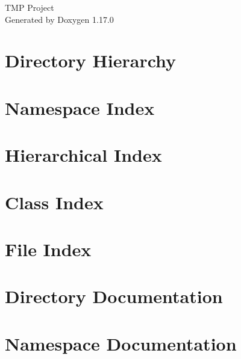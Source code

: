 \documentclass[twoside]{book}
\newcommand{\+}{\discretionary{\mbox{\scriptsize$\hookleftarrow$}}{}{}}
\newcommand{\clearemptydoublepage}{%
    \newpage{\pagestyle{empty}\cleardoublepage}%
  }
\begin{document}
  \raggedbottom
    \hypersetup{pageanchor=false,
                bookmarksnumbered=true,
                pdfencoding=unicode
               }
  \begin{titlepage}
  \vspace*{7cm}
  \begin{center}%
  {\Large TMP Project}\\
  \vspace*{1cm}
  {\large Generated by Doxygen 1.17.0}\\
  \end{center}
  \end{titlepage}
  \clearemptydoublepage
  \tableofcontents
  \clearemptydoublepage
  \hypersetup{pageanchor=true}
\chapter{Directory Hierarchy}

\chapter{Namespace Index}

\chapter{Hierarchical Index}

\chapter{Class Index}

\chapter{File Index}

\chapter{Directory Documentation}



\chapter{Namespace Documentation}


\end{document}
